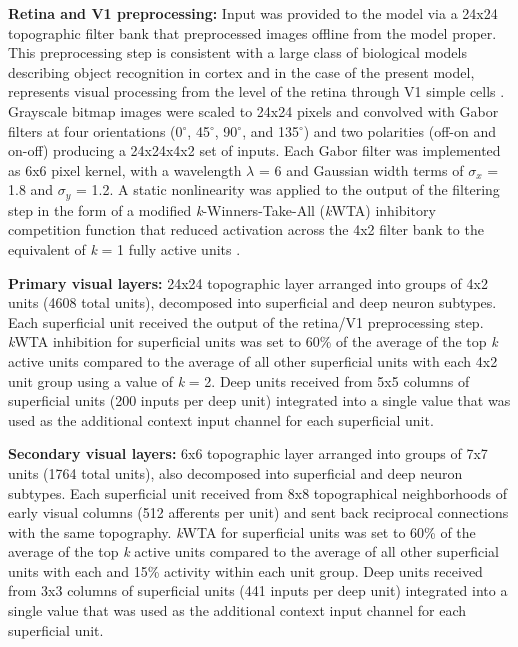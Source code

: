 \documentclass[dwyatte_dissertation.tex]{subfiles}
\begin{document}
\textbf{Retina and V1 preprocessing:} Input was provided to the model via a 24x24 topographic filter bank that preprocessed images offline from the model proper. This preprocessing step is consistent with a large class of biological models describing object recognition in cortex \cite[e.g.,]{RiesenhuberPoggio99,SerreOlivaPoggio07,OReillyWyatteHerdEtAl13} and in the case of the present model, represents visual processing from the level of the retina through V1 simple cells \cite{HubelWiesel62}. Grayscale bitmap images were scaled to 24x24 pixels and convolved with Gabor filters at four orientations (0$^\circ$, 45$^\circ$, 90$^\circ$, and 135$^\circ$) and two polarities (off-on and on-off) producing a 24x24x4x2 set of inputs. Each Gabor filter was implemented as 6x6 pixel kernel, with a wavelength $\lambda$ = 6 and Gaussian width terms of $\sigma_x$ = 1.8 and $\sigma_y$ = 1.2. A static nonlinearity was applied to the output of the filtering step in the form of a modified \textit{k}-Winners-Take-All (\textit{k}WTA) inhibitory competition function that reduced activation across the 4x2 filter bank to the equivalent of \textit{k} = 1 fully active units \cite[see][Supporting Information]{OReillyWyatteHerdEtAl13}.

\textbf{Primary visual layers:} 24x24 topographic layer arranged into groups of 4x2 units (4608 total units), decomposed into superficial and deep neuron subtypes. Each superficial unit received the output of the retina/V1 preprocessing step. \textit{k}WTA inhibition for superficial units was set to 60\% of the average of the top \textit{k} active units compared to the average of all other superficial units with each 4x2 unit group using a value of \textit{k} = 2. Deep units received from 5x5 columns of superficial units (200 inputs per deep unit) integrated into a single value that was used as the additional context input channel for each superficial unit.

\textbf{Secondary visual layers:} 6x6 topographic layer arranged into groups of 7x7 units (1764 total units), also decomposed into superficial and deep neuron subtypes. Each superficial unit received from 8x8 topographical neighborhoods of early visual columns (512 afferents per unit) and sent back reciprocal connections with the same topography. \textit{k}WTA for superficial units was set to 60\% of the average of the top \textit{k} active units compared to the average of all other superficial units with each and 15\% activity within each unit group. Deep units received from 3x3 columns of superficial units (441 inputs per deep unit) integrated into a single value that was used as the additional context input channel for each superficial unit.
\end{document}

